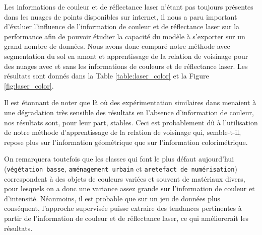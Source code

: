 \documentclass[a4paper, onecolumn, 11pt]{article}
\begin{document}
Les informations de couleur et de réflectance laser n'étant pas toujours présentes dans les nuages de points disponibles sur internet, il nous a paru important d'évaluer l'influence de l'information de couleur et de réflectance laser sur la performance afin de pouvoir étudier la capacité du modèle à s'exporter sur un grand nombre de données. Nous avons donc comparé notre méthode avec segmentation du sol en amont et apprentissage de la relation de voisinage pour des nuages avec et sans les informations de couleurs et de réflectance laser. Les résultats sont donnés dans la Table \ref{table:laser_color} et la Figure \ref{fig:laser_color}.

Il est étonnant de noter que là où des expérimentation similaires dans \cite{aka_article} menaient à une dégradation très sensible des résultats en l'absence d'information de couleur, nos résultats sont, pour leur part, stables. Ceci est probablement dû à l'utilisation de notre méthode d'apprentissage de la relation de voisinage qui, semble-t-il, repose plus sur l'information géométrique que sur l'information colorimétrique.

On remarquera toutefois que les classes qui font le plus défaut aujourd'hui (\texttt{végétation basse}, \texttt{aménagement urbain} et \texttt{aretefact de numérisation}) correspondent à des objets de couleurs variées et souvent de matériaux divers, pour lesquels on a donc une variance assez grande sur l'information de couleur et d'intensité. Néanmoins, il est probable que sur un jeu de données plus conséquent, l'approche supervisée puisse extraire des tendances pertinentes à partir de l'information de couleur et de réflectance laser, ce qui améliorerait les résultats.
\end{document}

